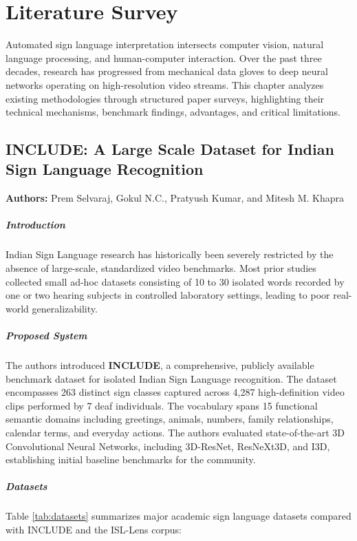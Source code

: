 \chapter{Literature Survey}

Automated sign language interpretation intersects computer vision, natural language processing, and human-computer interaction. Over the past three decades, research has progressed from mechanical data gloves to deep neural networks operating on high-resolution video streams. This chapter analyzes existing methodologies through structured paper surveys, highlighting their technical mechanisms, benchmark findings, advantages, and critical limitations.

\section{INCLUDE: A Large Scale Dataset for Indian Sign Language Recognition}
\textbf{Authors:} Prem Selvaraj, Gokul N.C., Pratyush Kumar, and Mitesh M. Khapra \cite{1}

\paragraph{Introduction}
Indian Sign Language research has historically been severely restricted by the absence of large-scale, standardized video benchmarks. Most prior studies collected small ad-hoc datasets consisting of 10 to 30 isolated words recorded by one or two hearing subjects in controlled laboratory settings, leading to poor real-world generalizability.

\paragraph{Proposed System}
The authors introduced \textbf{INCLUDE}, a comprehensive, publicly available benchmark dataset for isolated Indian Sign Language recognition. The dataset encompasses 263 distinct sign classes captured across 4,287 high-definition video clips performed by 7 deaf individuals. The vocabulary spans 15 functional semantic domains including greetings, animals, numbers, family relationships, calendar terms, and everyday actions. The authors evaluated state-of-the-art 3D Convolutional Neural Networks, including 3D-ResNet, ResNeXt3D, and I3D, establishing initial baseline benchmarks for the community.

\paragraph{Datasets}
Table \ref{tab:datasets} summarizes major academic sign language datasets compared with INCLUDE and the ISL-Lens corpus:

